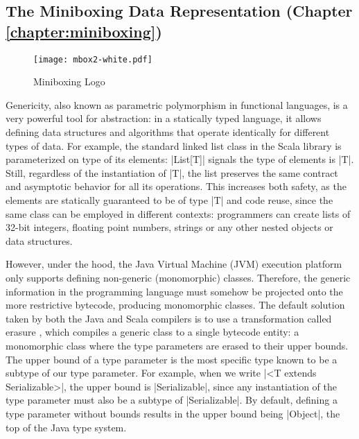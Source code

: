 \subsection{The Miniboxing Data Representation (Chapter \ref{chapter:miniboxing})}

\begin{wrapfigure}{r}{50mm}
  \centering
  \vspace{-3em}
  \texttt{[image: mbox2-white.pdf]}
  \vspace{-3em}
  \caption{Miniboxing Logo}
\end{wrapfigure}

Genericity, also known as parametric polymorphism in functional languages, is a very powerful tool for abstraction: in a statically typed language, it allows defining data structures and algorithms that operate identically for different types of data. For example, the standard linked list class in the Scala library is parameterized on type of its elements: |List[T]| signals the type of elements is |T|. Still, regardless of the instantiation of |T|, the list preserves the same contract and asymptotic behavior for all its operations. This increases both safety, as the elements are statically guaranteed to be of type |T| and code reuse, since the same class can be employed in different contexts: programmers can create lists of 32-bit integers, floating point numbers, strings or any other nested objects or data structures.

However, under the hood, the Java Virtual Machine (JVM) execution platform only supports defining non-generic (monomorphic) classes. Therefore, the generic information in the programming language must somehow be projected onto the more restrictive bytecode, producing monomorphic classes. The default solution taken by both the Java and Scala compilers is to use a transformation called erasure \cite{java-erasure}, which compiles a generic class to a single bytecode entity: a monomorphic class where the type parameters are erased to their upper bounds. The upper bound of a type parameter is the most specific type known to be a subtype of our type parameter. For example, when we write |<T extends Serializable>|, the upper bound is |Serializable|, since any instantiation of the type parameter must also be a subtype of |Serializable|. By default, defining a type parameter without bounds results in the upper bound being |Object|, the top of the Java type system.

